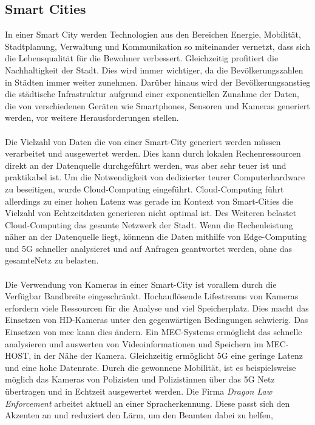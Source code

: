 \documentclass[runningheads]{llncs}
\numberwithin{figure}{section}
\begin{document}
\subsection{Smart Cities}
\label{subsec:Smart Cities}
In einer Smart City werden Technologien aus den Bereichen Energie, Mobilität, Stadtplanung, 
Verwaltung und Kommunikation so miteinander vernetzt, dass sich die Lebensqualität für die Bewohner verbessert. 
Gleichzeitig profitiert die Nachhaltigkeit der Stadt. Dies wird immer wichtiger, da die Bevölkerungszahlen in 
Städten immer weiter zunehmen.
Darüber hinaus wird der Bevölkerungsanstieg die städtische Infrastruktur aufgrund einer 
exponentiellen Zunahme der Daten, die von verschiedenen Geräten wie Smartphones, Sensoren und Kameras generiert werden, 
vor weitere Herausforderungen stellen. 
\\
\\
Die Vielzahl von Daten die von einer Smart-City generiert werden müssen verarbeitet und ausgewertet werden. Dies kann durch lokalen Rechenressourcen
direkt an der Datenquelle durchgeführt werden, was aber sehr teuer ist und praktikabel ist. 
Um die Notwendigkeit von dedizierter teurer Computerhardware zu beseitigen, wurde Cloud-Computing eingeführt. Cloud-Computing führt allerdings
zu einer hohen Latenz was gerade im Kontext von Smart-Cities die Vielzahl von Echtzeitdaten generieren nicht optimal ist.
Des Weiteren belastet Cloud-Computing das gesamte Netzwerk der Stadt. 
Wenn die Rechenleistung näher an der Datenquelle liegt, könnenn die Daten mithilfe von Edge-Computing und 5G schneller analysieret
und auf Anfragen geantwortet werden, ohne das gesamteNetz zu belasten.
\\
\\
Die Verwendung von Kameras in einer Smart-City ist vorallem durch die Verfügbar Bandbreite eingeschränkt. 
Hochauflösende Lifestreams von Kameras erfordern viele Ressourcen für die Analyse und viel Speicherplatz. 
Dies macht das Einsetzen von HD-Kameras unter den gegenwärtigen Bedingungen schwierig.
Das Einsetzen von \acrlong{mec} kann dies ändern. Ein MEC-Systems ermöglicht das schnelle analysieren und auswerten von
Videoinformationen und Speichern im MEC-HOST, in der Nähe der Kamera. Gleichzeitig ermöglicht  5G eine geringe Latenz und eine 
hohe Datenrate. Durch die gewonnene Mobilität, ist es beispielsweise möglich das Kameras von Polizisten und Polizistinnen über das 5G Netz
übertragen und in Echtzeit ausgewertet werden. Die Firma \textit{Dragon Law Enforcement} arbeitet aktuell an einer Spracherkennung.
Diese passt sich den Akzenten an und reduziert den Lärm, um den Beamten dabei zu helfen, 
\end{document}
